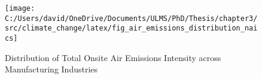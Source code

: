 \begin{figure}[H]
    \centering
    \texttt{[image: C:/Users/david/OneDrive/Documents/ULMS/PhD/Thesis/chapter3/src/climate\_change/latex/fig\_air\_emissions\_distribution\_naics]}
    \caption{Distribution of Total Onsite Air Emissions Intensity across Manufacturing Industries}
    \label{fig:air-emissions-distribution-naics}
\end{figure}
